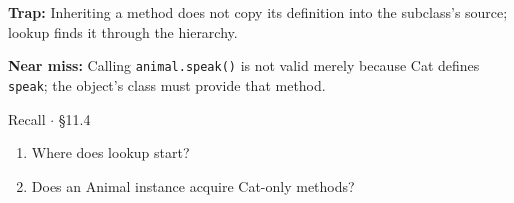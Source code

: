 \documentclass[11pt]{article}
\begin{document}
\begin{keepsection}
\begin{notebox}\textbf{Trap:} Inheriting a method does not copy its definition into the subclass’s source; lookup finds it through the hierarchy.\end{notebox}

\begin{notebox}\textbf{Near miss:} Calling \texttt{animal.speak()} is not valid merely because Cat defines \texttt{speak}; the object’s class must provide that method.\end{notebox}

\begin{recallbox}{Recall \ensuremath{\cdot} §11.4}
\begin{enumerate}
\item Where does lookup start?
\item Does an Animal instance acquire Cat-only methods?
\end{enumerate}

\end{recallbox}
\end{keepsection}
\end{document}
